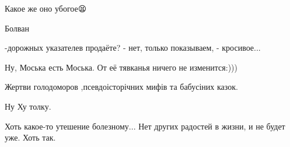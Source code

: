 \begin{itemize}
Какое же оно убогое😫

 
Болван

 
-дорожных указателев продаёте? - нет, только показываем, - кросивое...

 
Ну, Моська есть Моська. От её тявканья ничего не изменится:)))

 
Жертви голодоморов ,псевдоісторічних мифів та бабусіних казок.

 
Ну Ху толку.

 
Хоть какое-то утешение болезному...
Нет других радостей в жизни, и не будет уже. Хоть так.

 

\end{itemize}
